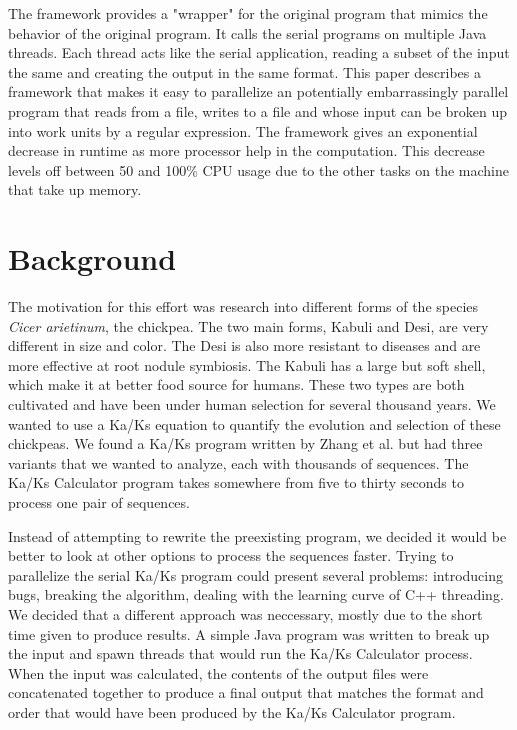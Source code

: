 \documentclass[12pt]{article}
\begin{document}
The framework provides a "wrapper" for the original program that mimics the
behavior of the original program. It calls the serial programs on multiple Java 
threads. Each thread acts like the serial application, reading a subset of the 
input the same and creating the output in the same format. This paper describes
a framework that makes it easy to parallelize an potentially embarrassingly
parallel program that reads from a file, writes to a file and whose input can be
broken up into work units by a regular expression. The framework gives an
exponential decrease in runtime as more processor help in the computation. This
decrease levels off between 50 and 100\% CPU usage due to the other tasks on the
machine that take up memory.

\section{Background}

The motivation for this effort was research into different forms of the 
species \emph{Cicer arietinum}, the chickpea. The two main forms, Kabuli and 
Desi, are very different in size and color. The Desi is also more resistant to 
diseases and are more effective at root nodule symbiosis. The Kabuli has a large 
but soft shell, which make it at better food source for humans. These two types 
are both cultivated and have been under human selection for several thousand 
years. We wanted to use a Ka/Ks equation to quantify the evolution and selection 
of these chickpeas. We found a Ka/Ks program written by Zhang et al. \cite{kaks}
but had three variants that we wanted to analyze, each with thousands of 
sequences. The Ka/Ks Calculator program takes somewhere from five to thirty 
seconds to process one pair of sequences. 

Instead of attempting to rewrite the preexisting program, we decided it would be
better to look at other options to process the sequences faster. Trying to 
parallelize the serial Ka/Ks program could present several problems: introducing
bugs, breaking the algorithm, dealing with the learning curve of C++ threading. 
We decided that a  different approach was neccessary, mostly due to the short 
time given to produce results. A simple Java program was written to break up the
input and spawn threads that would run the Ka/Ks Calculator process. When the 
input was calculated, the contents of the output files were concatenated 
together to produce a final output that matches the format and order that would 
have been produced by the Ka/Ks Calculator program.
\end{document}
